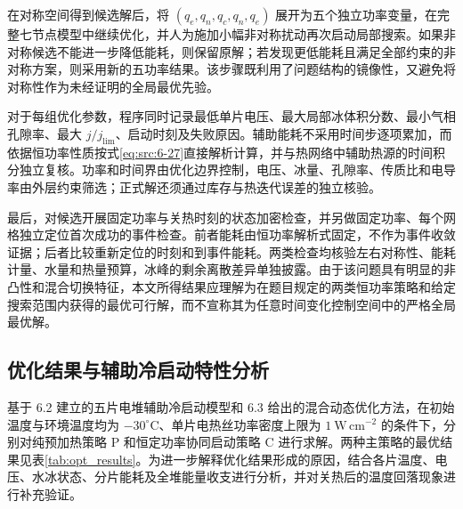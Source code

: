 \documentclass[bwprint]{gmcmthesis}
\numberwithin{equation}{section}
\numberwithin{figure}{section}
\begin{document}
 在对称空间得到候选解后，将 \((q_e, q_n, q_c, q_n, q_e)\) 展开为五个独立功率变量，在完整七节点模型中继续优化，并人为施加小幅非对称扰动再次启动局部搜索。如果非对称候选不能进一步降低能耗，则保留原解；若发现更低能耗且满足全部约束的非对称方案，则采用新的五功率结果。该步骤既利用了问题结构的镜像性，又避免将对称性作为未经证明的全局最优先验。

 对于每组优化参数，程序同时记录最低单片电压、最大局部冰体积分数、最小气相孔隙率、最大 \(j/j_{\text{lim}}\)、启动时刻及失败原因。辅助能耗不采用时间步逐项累加，而依据恒功率性质按式\eqref{eq:src:6-27}直接解析计算，并与热网络中辅助热源的时间积分独立复核。功率和时间界由优化边界控制，电压、冰量、孔隙率、传质比和电导率由外层约束筛选；正式解还须通过库存与热迭代误差的独立核验。

 最后，对候选开展固定功率与关热时刻的状态加密检查，并另做固定功率、每个网格独立定位首次成功的事件检查。前者能耗由恒功率解析式固定，不作为事件收敛证据；后者比较重新定位的时刻和到事件能耗。两类检查均核验左右对称性、能耗计量、水量和热量预算，冰峰的剩余离散差异单独披露。由于该问题具有明显的非凸性和混合切换特征，本文所得结果应理解为在题目规定的两类恒功率策略和给定搜索范围内获得的最优可行解，而不宣称其为任意时间变化控制空间中的严格全局最优解。

\subsection{优化结果与辅助冷启动特性分析}

基于 6.2 建立的五片电堆辅助冷启动模型和 6.3 给出的混合动态优化方法，在初始温度与环境温度均为 \(-30^\circ\mathrm C\)、单片电热丝功率密度上限为 \(1\ \mathrm{W\,cm^{-2}}\) 的条件下，分别对纯预加热策略 P 和恒定功率协同启动策略 C 进行求解。两种主策略的最优结果见表\ref{tab:opt_results}。为进一步解释优化结果形成的原因，结合各片温度、电压、水冰状态、分片能耗及全堆能量收支进行分析，并对关热后的温度回落现象进行补充验证。
\end{document}
